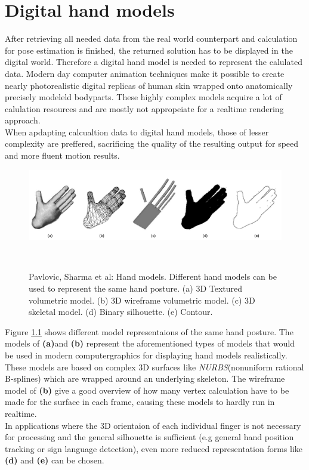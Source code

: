 \chapter{Digital hand models}
After retrieving all needed data from the real world counterpart and calculation for pose estimation is finished, the returned solution has to be displayed in the digital world. Therefore a digital hand model is needed to represent the calulated data. Modern day computer animation techniques make it possible to create nearly photorealistic digital replicas of human skin wrapped onto anatomically precisely modeleld bodyparts. These highly complex models acquire a lot of calulation resources and are mostly not appropeiate for a realtime rendering approach.\\
When apdapting calcualtion data to digital hand models, those of lesser complexity are preffered, sacrificing the quality of the resulting output for speed and more fluent motion results.
\begin{figure}[H]
\includegraphics[width=\textwidth]{images/Pavlovic-Sharmaetal.jpg}
\caption{Pavlovic, Sharma et al: Hand models. Different hand models can be used to represent the same hand posture. (a) 3D Textured volumetric model. (b) 3D wireframe volumetric model. (c) 3D skeletal model. (d) Binary silhouette. (e) Contour.}
~\cite[p.~682]{Pavlovic.1997}
\label{handmodels_detail_level}
\end{figure}
Figure \ref{handmodels_detail_level} shows different model representaions of the same hand posture. The models of \textbf{(a)}and \textbf{(b)} represent the aforementioned types of models that would be used in modern computergraphics for displaying hand models realistically.\\These models are based on complex 3D surfaces like \textit{NURBS}(nonuniform rational B-splines) which are wrapped around an underlying skeleton. The wireframe model of \textbf{(b)} give a good overview of how many vertex calculation have to be made for the surface in each frame, causing these models to hardly run in realtime.\\
In applications where the 3D orientaion of each individual finger is not necessary for processing and the general silhouette is sufficient (e.g general hand position tracking or sign language detection), even more reduced representation forms like \textbf{(d)} and \textbf{(e)} can be chosen.
